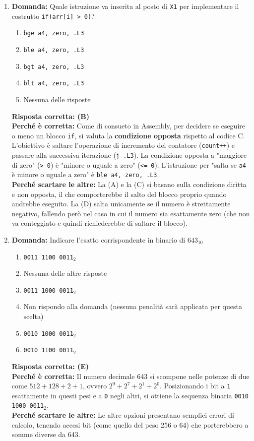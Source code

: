 \documentclass[12pt, a4paper]{article}
\begin{document}
\begin{enumerate}
    \item \textbf{Domanda:} Quale istruzione va inserita al posto di \texttt{X1} per implementare il costrutto \texttt{if(arr[i] > 0)}?
    \begin{enumerate}[label=(\Alph*)]
        \item \texttt{bge a4, zero, .L3}
        \item \texttt{ble a4, zero, .L3}
        \item \texttt{bgt a4, zero, .L3}
        \item \texttt{blt a4, zero, .L3}
        \item Nessuna delle risposte
    \end{enumerate}
    \textbf{Risposta corretta: (B)} \\
    \textbf{Perché è corretta:} Come di consueto in Assembly, per decidere se eseguire o meno un blocco \texttt{if}, si valuta la \textbf{condizione opposta} rispetto al codice C. L'obiettivo è saltare l'operazione di incremento del contatore (\texttt{count++}) e passare alla successiva iterazione (\texttt{j .L3}). La condizione opposta a "maggiore di zero" (\texttt{> 0}) è "minore o uguale a zero" (\texttt{<= 0}). L'istruzione per "salta se \texttt{a4} è minore o uguale a zero" è \texttt{ble a4, zero, .L3}. \\
    \textbf{Perché scartare le altre:} La (A) e la (C) si basano sulla condizione diritta e non opposta, il che comporterebbe il salto del blocco proprio quando andrebbe eseguito. La (D) salta unicamente se il numero è strettamente negativo, fallendo però nel caso in cui il numero sia esattamente zero (che non va conteggiato e quindi richiederebbe di saltare il blocco).
    
    \item \textbf{Domanda:} Indicare l'esatto corrispondente in binario di $643_{10}$
    \begin{enumerate}[label=(\Alph*)]
        \item \texttt{0011 1100 0011}$_2$
        \item Nessuna delle altre risposte
        \item \texttt{0011 1000 0011}$_2$
        \item Non rispondo alla domanda (nessuna penalità sarà applicata per questa scelta)
        \item \texttt{0010 1000 0011}$_2$
        \item \texttt{0010 1100 0011}$_2$
    \end{enumerate}
    \textbf{Risposta corretta: (E)} \\
    \textbf{Perché è corretta:} Il numero decimale 643 si scompone nelle potenze di due come $512 + 128 + 2 + 1$, ovvero $2^9 + 2^7 + 2^1 + 2^0$. Posizionando i bit a \texttt{1} esattamente in questi pesi e a \texttt{0} negli altri, si ottiene la sequenza binaria \texttt{0010 1000 0011}$_2$. \\
    \textbf{Perché scartare le altre:} Le altre opzioni presentano semplici errori di calcolo, tenendo accesi bit (come quello del peso 256 o 64) che porterebbero a somme diverse da 643.
    

\end{enumerate}
\end{document}
